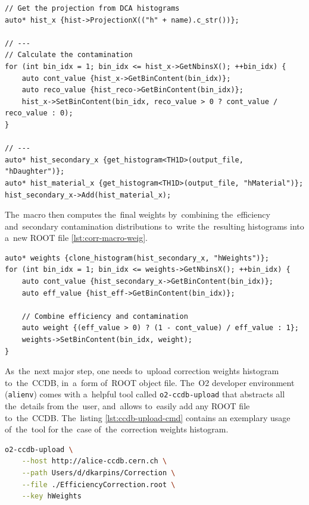\documentclass[11pt,a4paper,twoside]{book}
\numberwithin{equation}{chapter}
\begin{document}
\begin{lstlisting}[caption={\label{lst:corr-macro-cont} Snippet of the correction macro - secondary contamination.}]
// Get the projection from DCA histograms
auto* hist_x {hist->ProjectionX(("h" + name).c_str())};

// ---
// Calculate the contamination
for (int bin_idx = 1; bin_idx <= hist_x->GetNbinsX(); ++bin_idx) {
    auto cont_value {hist_x->GetBinContent(bin_idx)};
    auto reco_value {hist_reco->GetBinContent(bin_idx)};
    hist_x->SetBinContent(bin_idx, reco_value > 0 ? cont_value / reco_value : 0);
}

// ---
auto* hist_secondary_x {get_histogram<TH1D>(output_file, "hDaughter")};
auto* hist_material_x {get_histogram<TH1D>(output_file, "hMaterial")};
hist_secondary_x->Add(hist_material_x);
\end{lstlisting}

The macro then computes the final weights by combining the efficiency and secondary contamination distributions to write the resulting histograms into a new ROOT file \ref{lst:corr-macro-weig}.

\begin{lstlisting}[caption={\label{lst:corr-macro-weig} Snippet of the correction macro - correction weights.}]
auto* weights {clone_histogram(hist_secondary_x, "hWeights")};
for (int bin_idx = 1; bin_idx <= weights->GetNbinsX(); ++bin_idx) {
    auto cont_value {hist_secondary_x->GetBinContent(bin_idx)};
    auto eff_value {hist_eff->GetBinContent(bin_idx)};

    // Combine efficiency and contamination
    auto weight {(eff_value > 0) ? (1 - cont_value) / eff_value : 1};
    weights->SetBinContent(bin_idx, weight);
}
\end{lstlisting}

As the next major step, one needs to upload correction weights histogram to the CCDB, in a form of ROOT object file. The O2 developer environment (\verb|alienv|) comes with a helpful tool called \verb|o2-ccdb-upload| that abstracts all the details from the user, and allows to easily add any ROOT file to the CCDB. The listing \ref{lst:ccdb-upload-cmd} contains an exemplary usage of the tool for the case of the correction weights histogram.

\begin{lstlisting}[language={bash},caption={\label{lst:ccdb-upload-cmd} Example command for the CCDB upload.}]
o2-ccdb-upload \
    --host http://alice-ccdb.cern.ch \
    --path Users/d/dkarpins/Correction \
    --file ./EfficiencyCorrection.root \
    --key hWeights
\end{lstlisting}
\end{document}

